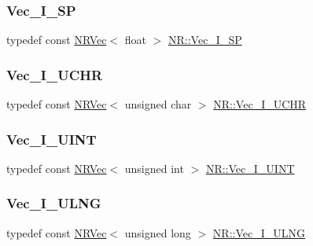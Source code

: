 \mbox{\label{namespaceNR_a71d18e93c460e6909aea027558a47cf5}} 
\subsubsection{\texorpdfstring{Vec\_I\_SP}{Vec\_I\_SP}}
{\footnotesize\ttfamily typedef const \mbox{\hyperlink{classNR_1_1NRVec}{N\+R\+Vec}}$<$ float $>$ \mbox{\hyperlink{namespaceNR_a71d18e93c460e6909aea027558a47cf5}{N\+R\+::\+Vec\+\_\+\+I\+\_\+\+SP}}}

\mbox{\label{namespaceNR_ace0fbcd7daadfbf5e4e7db2a317a5b46}} 
\subsubsection{\texorpdfstring{Vec\_I\_UCHR}{Vec\_I\_UCHR}}
{\footnotesize\ttfamily typedef const \mbox{\hyperlink{classNR_1_1NRVec}{N\+R\+Vec}}$<$ unsigned char $>$ \mbox{\hyperlink{namespaceNR_ace0fbcd7daadfbf5e4e7db2a317a5b46}{N\+R\+::\+Vec\+\_\+\+I\+\_\+\+U\+C\+HR}}}

\mbox{\label{namespaceNR_afd875cd4a9ff5a070ac7b7e5d5e6d145}} 
\subsubsection{\texorpdfstring{Vec\_I\_UINT}{Vec\_I\_UINT}}
{\footnotesize\ttfamily typedef const \mbox{\hyperlink{classNR_1_1NRVec}{N\+R\+Vec}}$<$ unsigned int $>$ \mbox{\hyperlink{namespaceNR_afd875cd4a9ff5a070ac7b7e5d5e6d145}{N\+R\+::\+Vec\+\_\+\+I\+\_\+\+U\+I\+NT}}}

\mbox{\label{namespaceNR_a117570729decc729db86f7655e7a23e5}} 
\subsubsection{\texorpdfstring{Vec\_I\_ULNG}{Vec\_I\_ULNG}}
{\footnotesize\ttfamily typedef const \mbox{\hyperlink{classNR_1_1NRVec}{N\+R\+Vec}}$<$ unsigned long $>$ \mbox{\hyperlink{namespaceNR_a117570729decc729db86f7655e7a23e5}{N\+R\+::\+Vec\+\_\+\+I\+\_\+\+U\+L\+NG}}}

